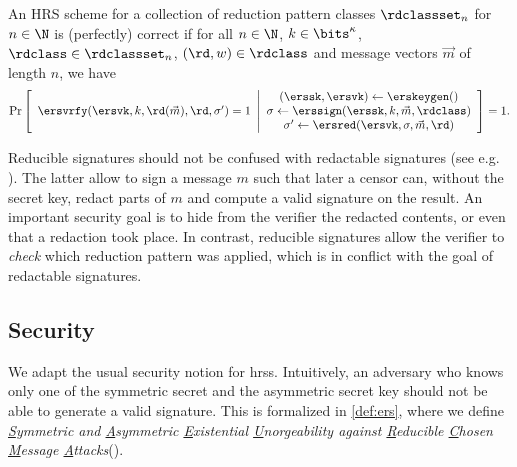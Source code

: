 \begin{definition}
  An HRS scheme \ers for a collection of reduction pattern classes $\rdclassset_n$ for $n\in\N$ is (perfectly) correct if for all $n \in \N$, $k\in\bits^\kappa$, $\rdclass \in \rdclassset_n$, $(\rd,w) \in \rdclass$ and message vectors $\vec m$ of length $n$, we have
  \begin{equation*}
    \Pr\left[
    \begin{array}{c}
      \ersvrfy(\ersvk, k, \rd(\vec{m}), \rd, \sigma') = 1
    \end{array}
    \middle\vert
    \begin{array}{c}
      (\erssk, \ersvk) \gets \erskeygen()\\
      \sigma \gets \erssign(\erssk, k, \vec{m}, \rdclass) \\
      \sigma' \gets \ersred(\ersvk, \sigma, \vec{m},\rd)
    \end{array}
    \right] = 1.
  \end{equation*}
\end{definition}

\begin{remark}
  Reducible signatures should not be confused with redactable signatures (see e.g. \cite{ACNS:BBDFFK10, ACNS:PohSam14,
    ICISC:DPSS15, EPRINT:HabHorZha16}). The latter allow to sign a message $m$ such that later a censor can, without the secret key, redact parts of $m$ and compute a valid signature on the result. An important security goal is to hide from the verifier the redacted contents, or even that a redaction took place. In contrast, reducible signatures allow the verifier to \emph{check} which reduction pattern was applied, which is in conflict with the goal of redactable signatures.
\label{rem:rsig}\end{remark}

\subsection{Security}

We adapt the usual \ufcma security notion for \aclp{hrs}. Intuitively, an adversary who knows
only one of the symmetric secret and the asymmetric secret key should not be able to generate a valid signature. This is
formalized in \cref{def:ers}, where we define \emph{\underline{S}ymmetric and \underline{A}symmetric
  \underline{E}xistential \underline{U}n\underline{}orgeability against \underline{R}educible \underline{C}hosen \underline{M}essage
  \underline{A}ttacks}(\ersufcma).

